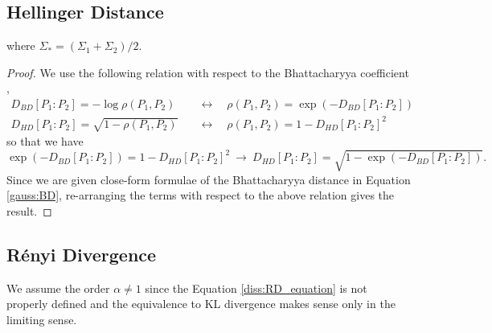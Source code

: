 \documentclass[11pt]{article}
\newcommand{\Renyi}{R\'{e}nyi }
\begin{document}
\subsection*{Hellinger Distance}
\begin{center}
\end{center}
where $\Sigma_* = (\Sigma_1+\Sigma_2)/2$. 
\begin{proof}
	We use the following relation with respect to the Bhattacharyya coefficient ,
	\begin{align*}
	D_{BD}[P_1:P_2] = -\log \rho(P_1,P_2) \quad&\leftrightarrow\quad \rho(P_1,P_2) = \exp(-D_{BD}[P_1:P_2])\\
	D_{HD}[P_1:P_2] = \sqrt{1-\rho(P_1,P_2)}\quad&\leftrightarrow\quad
	\rho(P_1,P_2) = 1 - 	D_{HD}[P_1:P_2]^2
	\end{align*}
	so that we have
	\begin{equation*}
	\exp(-D_{BD}[P_1:P_2])	= 1 - 	D_{HD}[P_1:P_2]^2 ~\rightarrow~ D_{HD}[P_1:P_2] = \sqrt{1-\exp(-D_{BD}[P_1:P_2])}.
	\end{equation*}
	Since we are given close-form formulae of the Bhattacharyya distance in Equation \eqref{gauss:BD}, re-arranging the terms with respect to the above relation gives the result. 
\end{proof}


\subsection*{\Renyi Divergence}
We assume the order $\alpha \neq 1$ since the Equation \eqref{diss:RD_equation} is not properly defined and the equivalence to KL divergence makes sense only in the limiting sense.

\begin{center}
\end{center}
\end{document}
